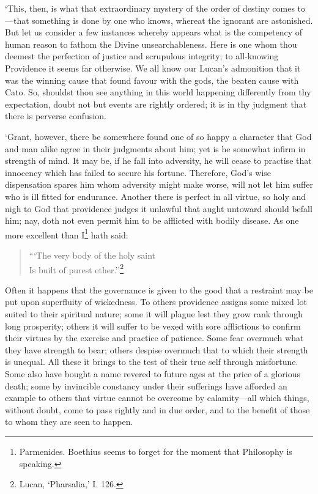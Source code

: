 \documentclass[11pt]{book}
\begin{document}
`This, then, is what that extraordinary mystery of the order of destiny
comes to---that something is done by one who knows, whereat the ignorant
are astonished. But let us consider a few instances whereby appears what
is the competency of human reason to fathom the Divine unsearchableness.
Here is one whom thou deem\-est the perfection of justice and scrupulous
integrity; to all-knowing Providence it seems far otherwise. We all know
our Lucan's admonition that it was the winning cause that found favour
with the gods, the beaten cause with Cato. So, shouldst thou see
anything in this world happening differently from thy expectation, doubt
not but events are rightly ordered; it is in thy judgment that there is
perverse confusion.

`Grant, however, there be somewhere found one of so happy a character
that God and man alike agree in their judgments about him; yet is he
somewhat infirm in strength of mind. It may be, if he fall into
adversity, he will cease to practise that innocency which has failed to
secure his fortune. Therefore, God's wise dispensation spares him whom
adversity might make worse, will not let him suffer who is ill fitted
for endurance. Another there is perfect in all virtue, so holy and nigh
to God that providence judges it unlawful that aught untoward should
befall him; nay, doth not even permit him to be afflicted with bodily
disease. As one more excellent than I\footnote{Parmenides. Boethius seems to forget for the moment that Philosophy is speaking.}
hath said:

\begin{quote}
    ```The very body of the holy saint \\
    Is built of purest ether.''\footnote{Lucan, `Pharsalia,’ I. 126.}
\end{quote}

Often it happens that the governance is given to the good that a
restraint may be put upon superfluity of wickedness. To others
providence assigns some mixed lot suited to their spiritual nature; some
it will plague lest they grow rank through long prosperity; others it
will suffer to be vexed with sore afflictions to confirm their virtues
by the exercise and practice of patience. Some fear overmuch what they
have strength to bear; others despise overmuch that to which their
strength is unequal. All these it brings to the test of their true self
through misfortune. Some also have bought a name revered to future ages
at the price of a glorious death; some by invincible constancy under
their sufferings have afforded an example to others that virtue cannot
be overcome by calamity---all which things, without doubt, come to pass
rightly and in due order, and to the benefit of those to whom they are
seen to happen.
\end{document}
